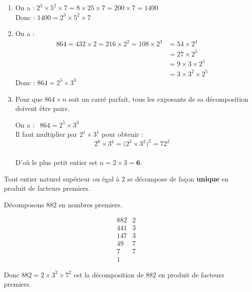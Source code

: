 \documentclass[10pt, a4paper]{article}
\begin{document}
\begin{Solution}[ACTIVITÉ][3]
\begin{enumerate}[leftmargin=*,itemsep=0.5pt]
    \item On a :
        $2^3 \times 5^2 \times 7 = 8 \times 25 \times 7 
        = 200 \times 7 
        = 1400$ \\
    Donc : \quad $1400 = 2^3 \times 5^2 \times 7$
    
    \item On a : 
    \begin{align*}
        864 = 432 \times 2 
            = 216 \times 2^2 
            = 108 \times 2^3
            &= 54 \times 2^4 \\
            &= 27 \times 2^5 \\
            &= 9  \times 3 \times 2^5 \\
            &= 3  \times 3^2 \times 2^5
    \end{align*}    
    Donc : \quad $864 = 2^5 \times 3^3$
    
    \item Pour que $864 \times n$ soit un carré parfait, tous les exposants de sa décomposition doivent être pairs.

On a :~ $864 = 2^5 \times 3^3$ \\
Il faut multiplier par $2^1 \times 3^1$ pour obtenir : 
$$2^6 \times 3^4 = \big(2^3 \times 3^2\big)^2 = 72^2$$ \\
D'où le plus petit entier est $n = 2 \times 3 = \mathbf{6}$.
\end{enumerate}
\end{Solution}


\begin{Theoreme}

Tout entier naturel supérieur ou égal à $2$ se décompose de façon \textbf{unique} en produit
de facteurs premiers.
\end{Theoreme}

\begin{Exemple}[][5 min]
Décomposons $882$ en nombres premiers.

$$
\begin{array}{r|l}
882 & 2 \\
441 & 3 \\
147 & 3 \\
49 & 7 \\
7 & 7 \\
1 & 
\end{array}
$$

Donc $882 = 2 \times 3^2 \times 7^2$ est la décomposition de $882$ en produit de facteurs premiers.
\end{Exemple}
\end{document}
